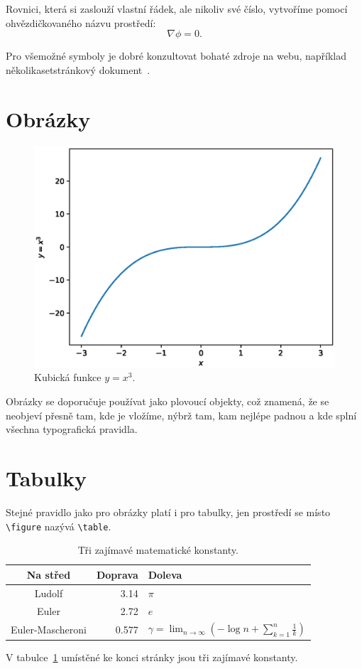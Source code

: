 \documentclass{article}
\begin{document}
	Rovnici, která si zaslouží vlastní řádek, ale nikoliv své číslo, vytvoříme pomocí ohvězdičkovaného názvu prostředí:
	\begin{equation*}
		\nabla\phi=0.
	\end{equation*}

	Pro všemožné symboly je dobré konzultovat bohaté zdroje na webu,
	například několikasetstránkový dokument~\cite{SymbolList2017}. 
	
	\section{Obrázky}
		\begin{figure}[!htbp]
			\centering
			\includegraphics[width=0.8\linewidth]{kubik.eps}
			\caption{Kubická funkce $y=x^3$.}
			\label{fig:bandf}
		\end{figure}
		Obrázky se doporučuje používat jako plovoucí objekty, což znamená, že se neobjeví přesně tam, kde je vložíme, nýbrž tam, kam nejlépe padnou a kde splní všechna typografická pravidla.

	\section{Tabulky}
		Stejné pravidlo jako pro obrázky platí i pro tabulky, jen prostředí se místo \verb+\figure+ nazývá \verb+\table+.
		\begin{table}[b]
			\centering
			\begin{tabular}{|c || r l |} 
			\hline
				Na střed & Doprava & Doleva \\				
			\hline\hline
				Ludolf & 3.14 & $\pi$ \\
				Euler & 2.72 & $e$ \\
				Euler-Mascheroni & 0.577 & $\gamma=\lim_{n\rightarrow\infty}\left(-\log n+\sum_{k=1}^{n}\frac{1}{k}\right)$ \\
			\hline
			\end{tabular}
			\caption{Tři zajímavé matematické konstanty.}
			\label{tab:tabulka}
		\end{table}
		V tabulce~\ref{tab:tabulka} umístěné ke konci stránky jsou tři zajímavé konstanty.
\end{document}
